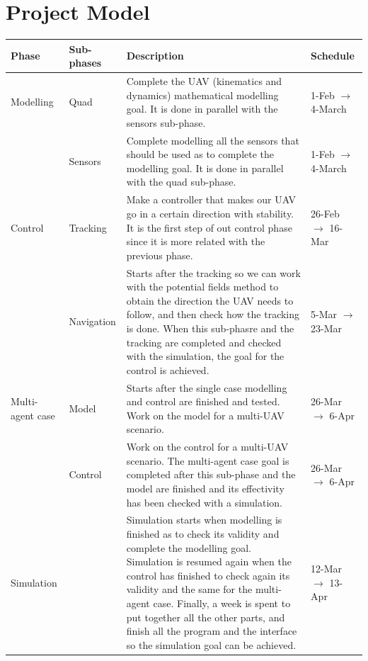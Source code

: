 \documentclass{article}
\begin{document}
	
	
	\section{Project Model}
				\begin{center}
			\begin{tabular}{|C{2cm}|C{2cm}|C{7cm}|C{3cm}|} \hline
				Phase & Sub-phases & Description & Schedule\\ \hline
				Modelling & Quad & Complete the UAV (kinematics and dynamics) mathematical modelling goal. It is done in parallel with the sensors sub-phase. &  1-Feb $\rightarrow$ 4-March  \\ 
				& Sensors & Complete modelling all the sensors that should be used as to complete the modelling goal. It is done in parallel with the quad sub-phase. & 1-Feb $\rightarrow$ 4-March \\ \hline
				
				Control & Tracking & Make a controller that makes our UAV go in a certain direction with stability. It is the first step of out control phase since it is more related with the previous phase. &  26-Feb $\rightarrow$ 16-Mar\\ 
				&Navigation & Starts after the tracking so we can work with the potential fields method to obtain the direction the UAV needs to follow, and then check how the tracking is done. When this sub-phasre and the tracking are completed and checked with the simulation, the goal for the control is achieved. & 5-Mar $\rightarrow$ 23-Mar \\ \hline
				
				Multi-agent case & Model & Starts after the single case modelling and control are finished and tested. Work on the model for a multi-UAV scenario. & 26-Mar $\rightarrow$ 6-Apr\\ 
				&Control & Work on the control for a multi-UAV scenario. The multi-agent case goal is completed after this sub-phase and the model are finished and its effectivity has been checked with a simulation. & 26-Mar $\rightarrow$ 6-Apr \\ \hline
				
				Simulation & & Simulation starts when modelling is finished as to check its validity and complete the modelling goal. Simulation is resumed again when the control has finished to check again its validity and the same for the multi-agent case. Finally, a week is spent to put together all the other parts, and finish all the program and the interface so the simulation goal can be achieved. & 12-Mar $\rightarrow$ 13-Apr \\ \hline
				

\end{tabular}
\end{center}
\end{document}

